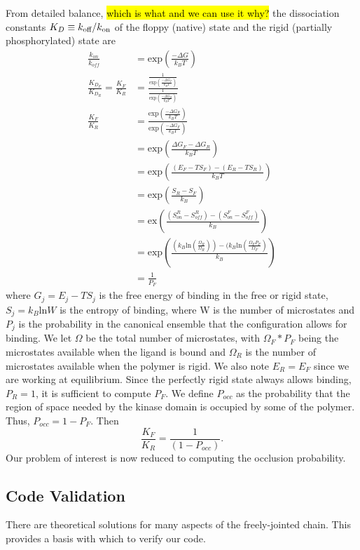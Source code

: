 \documentclass[../AdvancementSummary.tex]{subfiles}
\begin{document}
From detailed balance, \hl{which is what and we can use it why?} the dissociation constants $K_D \equiv k_{\mbox{\scriptsize off}}/k_{\mbox{\scriptsize on}}$ of the floppy (native) state and the rigid (partially phosphorylated) state are
\begin{align} 
\frac{k_{on}}{k_{off}} &= \mbox{exp} \left( \frac{-\Delta G}{k_B T}\right) \\
\frac{K_{D_F}}{K_{D_R}} = \frac{K_F}{K_R} &= \frac{\frac{1}{\mbox{exp} \left( \frac{-\Delta G_F}{k_B T}\right) }}{\frac{1}{\mbox{exp} \left( \frac{-\Delta G_R}{k_B T}\right)}} \\ 
\frac{K_F}{K_R} &= \frac{\mbox{exp} \left( \frac{-\Delta G_R}{k_B T} \right)}{\mbox{exp} \left( \frac{-\Delta G_F}{k_B T} \right)} \\
&= \mbox{exp} \left(\frac{\Delta G_F-\Delta G_R}{k_B T}\right) \\
&= \mbox{exp} \left( \frac{(E_F-T S_F)-(E_R-T S_R)}{k_B T} \right) \\
&= \mbox{exp} \left(\frac{S_R-S_F}{k_B}\right) \\
&=\mbox{ex}\left(\frac{(S^R_{on}-S^R_{off}) - (S^F_{on}-S^F_{off})}{k_B} \right) \\
&= \mbox{exp} \left( \frac{(k_B \mbox{ln} (\frac{\Omega_R}{\Omega_R}))-(k_B \mbox{ln}(\frac{\Omega_F P_F}{\Omega_F})}{k_B} \right) \\
&= \frac{1}{P_F}
\end{align}  
where $G_j=E_j-TS_j$ is the free energy of binding in the free or rigid state, $S_j = k_B \mbox{ln} W$ is the entropy of binding, where W is the number of microstates and $P_j$ is the probability in the canonical ensemble that the configuration allows for binding. We let $\Omega$ be the total number of microstates, with $\Omega_F * P_F$ being the microstates available when the ligand is bound and $\Omega_R$ is the number of microstates available when the polymer is rigid.  We also note $E_R = E_F$ since we are working at equilibrium. Since the perfectly rigid state always allows binding, $P_R=1$, it is sufficient to compute $P_F$. We define $P_{occ}$ as the probability that the region of space needed by the kinase domain is occupied by some of the polymer. Thus, $P_{occ}=1-P_F$. Then
\begin{equation}
\frac{K_F}{K_R} = \frac{1}{(1-P_{occ})}.
\end{equation}
Our problem of interest is now reduced to computing the occlusion probability. 


\subsection{Code Validation}
There are theoretical solutions for many aspects of the freely-jointed chain.  This provides a basis with which to verify our code.  
\end{document}
